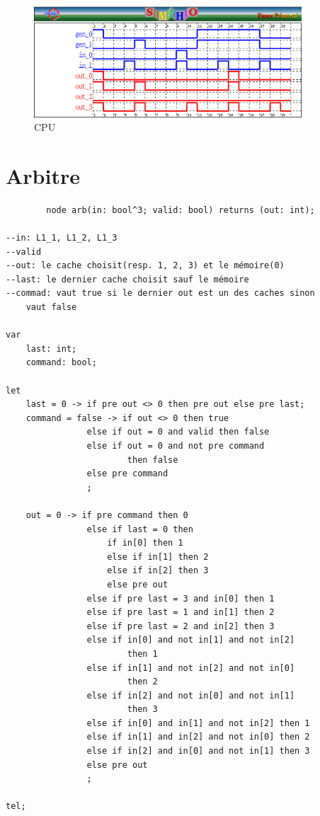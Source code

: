 \documentclass[a4paper,11pt]{report}
\begin{document}
	\begin{figure}[!htbp]
		\centering
		\includegraphics[width = 10cm]{cpu_diag.png}
		\caption{CPU}
	\end{figure}
	
\chapter{Arbitre}
	\begin{framed}
		\begin{verbatim}
		node arb(in: bool^3; valid: bool) returns (out: int);

--in: L1_1, L1_2, L1_3
--valid
--out: le cache choisit(resp. 1, 2, 3) et le mémoire(0)
--last: le dernier cache choisit sauf le mémoire
--commad: vaut true si le dernier out est un des caches sinon 
	vaut false

var
    last: int;
    command: bool;

let
    last = 0 -> if pre out <> 0 then pre out else pre last;
    command = false -> if out <> 0 then true
                else if out = 0 and valid then false
                else if out = 0 and not pre command 
                		then false
                else pre command
                ;

    out = 0 -> if pre command then 0
                else if last = 0 then
                    if in[0] then 1
                    else if in[1] then 2
                    else if in[2] then 3
                    else pre out
                else if pre last = 3 and in[0] then 1
                else if pre last = 1 and in[1] then 2
                else if pre last = 2 and in[2] then 3
                else if in[0] and not in[1] and not in[2] 
                		then 1
                else if in[1] and not in[2] and not in[0] 
                		then 2
                else if in[2] and not in[0] and not in[1] 
                		then 3
                else if in[0] and in[1] and not in[2] then 1
                else if in[1] and in[2] and not in[0] then 2
                else if in[2] and in[0] and not in[1] then 3
                else pre out
                ;

tel;
		\end{verbatim}
	\end{framed}
	
\end{document}
